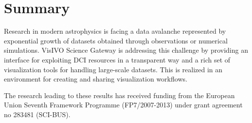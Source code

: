 \section{Summary}
Research in modern astrophysics is facing a data avalanche represented by exponential growth of datasets obtained through observations or numerical simulations. VisIVO Science Gateway is addressing this challenge by providing an interface for exploiting DCI resources in a transparent way and a rich set of visualization tools for handling large-scale datasets. This is realized in an environment for creating and sharing visualization workflows.  

\acknowledgements The research leading to these results has received funding from the European Union Seventh Framework Programme (FP7/2007-2013) under grant agreement no 283481 (SCI-BUS).



